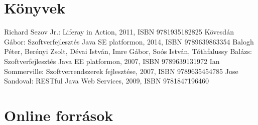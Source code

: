 \documentclass[hidelinks, 12pt, a4paper]{report}
\begin{document}

\clearpage
{}
\begin{thebibliography}{10}

\section*{Könyvek}

 Richard Sezov Jr.: Liferay in Action, 2011, ISBN 9781935182825
 Kövesdán Gábor: Szoftverfejlesztés Java SE platformon, 2014, ISBN 9789639863354
 Balogh Péter, Berényi Zsolt, Dévai István, Imre Gábor, Soós István, Tóthfalussy Balázs: Szoftverfejlesztés Java EE platformon, 2007, ISBN 9789639131972
 Ian Sommerville: Szoftverrendszerek fejlesztése, 2007, ISBN 9789635454785
 Jose Sandoval: RESTful Java Web Services, 2009, ISBN 9781847196460

\section*{Online források}


\end{thebibliography}
\end{document}
